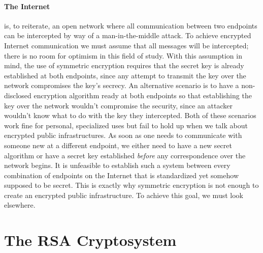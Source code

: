 \documentclass[12pt]{article}
\theoremstyle{remark}
\begin{document}
\paragraph{The Internet} is, to reiterate, an open network where all communication between two endpoints can be intercepted by way of a man-in-the-middle attack.  To achieve encrypted Internet communication we must assume that all messages will be intercepted; there is no room for optimism in this field of study.  With this assumption in mind, the use of symmetric encryption requires that the secret key is already established at both endpoints, since any attempt to transmit the key over the network compromises the key's secrecy.  An alternative scenario is to have a non-disclosed encryption algorithm ready at both endpoints so that establishing the key over the network wouldn't compromise the security, since an attacker wouldn't know what to do with the key they intercepted.  Both of these scenarios work fine for personal, specialized uses but fail to hold up when we talk about encrypted public infrastructures.  As soon as one needs to communicate with someone new at a different endpoint, we either need to have a new secret algorithm or have a secret key established \textit{before} any correspondence over the network begins.  It is unfeasible to establish such a system between every combination of endpoints on the Internet that is standardized yet somehow supposed to be secret.  This is exactly why symmetric encryption is not enough to create an encrypted public infrastructure.  To achieve this goal, we must look elsewhere.



\section{The RSA Cryptosystem}
\end{document}
